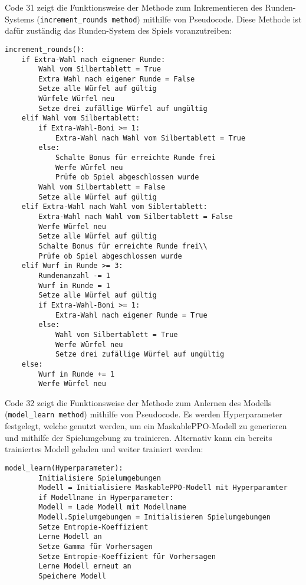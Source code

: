 Code 31 zeigt die Funktionsweise der Methode zum Inkrementieren des Runden-Systems (\texttt{increment\_rounds method}) mithilfe von Pseudocode. Diese Methode ist dafür zuständig das Runden-System des Spiels voranzutreiben:
\vspace{0.5cm}
\begin{lstlisting}[caption={Methode zum Inkrementieren des Runden-Systems}]
increment_rounds():
	if Extra-Wahl nach eignener Runde:
		Wahl vom Silbertablett = True
		Extra Wahl nach eigener Runde = False
		Setze alle Würfel auf gültig
		Würfele Würfel neu
		Setze drei zufällige Würfel auf ungültig
	elif Wahl vom Silbertablett:
		if Extra-Wahl-Boni >= 1:
			Extra-Wahl nach Wahl vom Silbertablett = True
		else:
			Schalte Bonus für erreichte Runde frei
			Werfe Würfel neu
			Prüfe ob Spiel abgeschlossen wurde
		Wahl vom Silbertablett = False
		Setze alle Würfel auf gültig
	elif Extra-Wahl nach Wahl vom Siblertablett:
		Extra-Wahl nach Wahl vom Silbertablett = False
		Werfe Würfel neu
		Setze alle Würfel auf gültig
		Schalte Bonus für erreichte Runde frei\\
		Prüfe ob Spiel abgeschlossen wurde
	elif Wurf in Runde >= 3:
		Rundenanzahl -= 1
		Wurf in Runde = 1
		Setze alle Würfel auf gültig
		if Extra-Wahl-Boni >= 1:
			Extra-Wahl nach eigener Runde = True
		else:
			Wahl vom Silbertablett = True
			Werfe Würfel neu
			Setze drei zufällige Würfel auf ungültig	
	else:
		Wurf in Runde += 1
		Werfe Würfel neu
\end{lstlisting}

\begin{minipage}{\linewidth}
	Code 32 zeigt die Funktionsweise der Methode zum Anlernen des Modells (\texttt{model\_learn method}) mithilfe von Pseudocode. Es werden Hyperparameter festgelegt, welche genutzt werden, um ein MaskablePPO-Modell zu generieren und mithilfe der Spielumgebung zu trainieren. Alternativ kann ein bereits trainiertes Modell geladen und weiter trainiert werden:
	\vspace{0.5cm}
	\begin{lstlisting}[caption={Methode zu Anlernen des Modells},morekeywords={Hyperparameter}]
		model_learn(Hyperparameter):
		Initialisiere Spielumgebungen
		Modell = Initialisiere MaskablePPO-Modell mit Hyperparamter
		if Modellname in Hyperparameter:
		Modell = Lade Modell mit Modellname
		Modell.Spielumgebungen = Initialisieren Spielumgebungen
		Setze Entropie-Koeffizient
		Lerne Modell an
		Setze Gamma für Vorhersagen
		Setze Entropie-Koeffizient für Vorhersagen
		Lerne Modell erneut an
		Speichere Modell
	\end{lstlisting}
\end{minipage}

